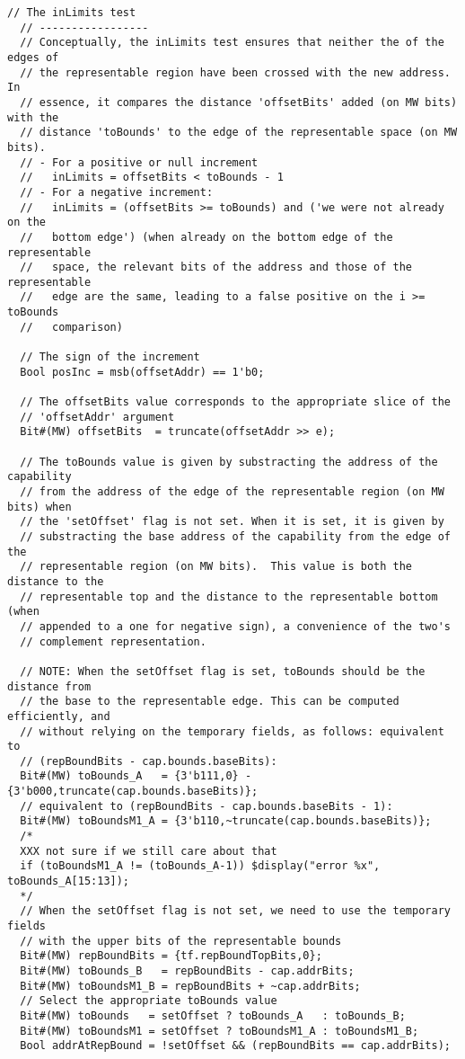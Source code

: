 \begin{lstlisting}[language=bluespec]
  // The inLimits test
  // -----------------
  // Conceptually, the inLimits test ensures that neither the of the edges of
  // the representable region have been crossed with the new address. In
  // essence, it compares the distance 'offsetBits' added (on MW bits) with the
  // distance 'toBounds' to the edge of the representable space (on MW bits).
  // - For a positive or null increment
  //   inLimits = offsetBits < toBounds - 1
  // - For a negative increment:
  //   inLimits = (offsetBits >= toBounds) and ('we were not already on the
  //   bottom edge') (when already on the bottom edge of the representable
  //   space, the relevant bits of the address and those of the representable
  //   edge are the same, leading to a false positive on the i >= toBounds
  //   comparison)

  // The sign of the increment
  Bool posInc = msb(offsetAddr) == 1'b0;

  // The offsetBits value corresponds to the appropriate slice of the
  // 'offsetAddr' argument
  Bit#(MW) offsetBits  = truncate(offsetAddr >> e);

  // The toBounds value is given by substracting the address of the capability
  // from the address of the edge of the representable region (on MW bits) when
  // the 'setOffset' flag is not set. When it is set, it is given by
  // substracting the base address of the capability from the edge of the
  // representable region (on MW bits).  This value is both the distance to the
  // representable top and the distance to the representable bottom (when
  // appended to a one for negative sign), a convenience of the two's
  // complement representation.

  // NOTE: When the setOffset flag is set, toBounds should be the distance from
  // the base to the representable edge. This can be computed efficiently, and
  // without relying on the temporary fields, as follows: equivalent to
  // (repBoundBits - cap.bounds.baseBits):
  Bit#(MW) toBounds_A   = {3'b111,0} - {3'b000,truncate(cap.bounds.baseBits)};
  // equivalent to (repBoundBits - cap.bounds.baseBits - 1):
  Bit#(MW) toBoundsM1_A = {3'b110,~truncate(cap.bounds.baseBits)};
  /*
  XXX not sure if we still care about that
  if (toBoundsM1_A != (toBounds_A-1)) $display("error %x", toBounds_A[15:13]);
  */
  // When the setOffset flag is not set, we need to use the temporary fields
  // with the upper bits of the representable bounds
  Bit#(MW) repBoundBits = {tf.repBoundTopBits,0};
  Bit#(MW) toBounds_B   = repBoundBits - cap.addrBits;
  Bit#(MW) toBoundsM1_B = repBoundBits + ~cap.addrBits;
  // Select the appropriate toBounds value
  Bit#(MW) toBounds   = setOffset ? toBounds_A   : toBounds_B;
  Bit#(MW) toBoundsM1 = setOffset ? toBoundsM1_A : toBoundsM1_B;
  Bool addrAtRepBound = !setOffset && (repBoundBits == cap.addrBits);


\end{lstlisting}
